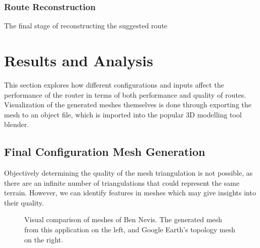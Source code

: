\documentclass[12pt]{article}
\begin{document}
\subsubsection{Route Reconstruction}

The final stage of reconstructing the suggested route

\section{Results and Analysis}

This section explores how different configurations and inputs affect the performance of the router in terms of both performance and quality of routes. Visualization of the generated meshes themselves is done through exporting the mesh to an object file, which is imported into the popular 3D modelling tool blender.

\subsection{Final Configuration Mesh Generation}

Objectively determining the quality of the mesh triangulation is not possible, as there are an infinite number of triangulations that could represent the same terrain. However, we can identify features in meshes which may give insights into their quality.

\begin{figure}[H]
  \centering
  \caption{Visual comparison of meshes of Ben Nevis. The generated mesh from this application on the left, and Google Earth's topology mesh on the right.}\label{fig:mesh:benNevis:comparison}
\end{figure}
\end{document}
